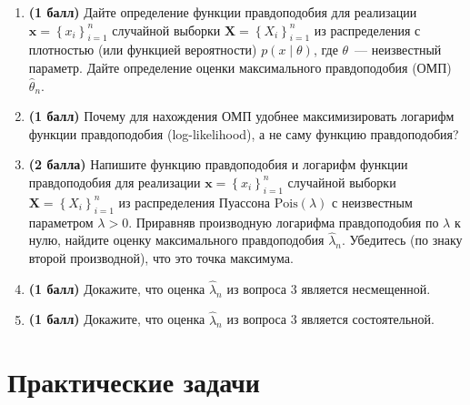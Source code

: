 \documentclass[a4paper,12pt]{article}
\newcommand{\pts}[1]{\textbf{(#1)}}
\begin{document}
\begin{enumerate}
  \item \pts{1 балл} Дайте определение функции правдоподобия для реализации $\mathbf{x}=\left\{x_i\right\}_{i=1}^n$ случайной выборки $\mathbf{X}=\left\{X_i\right\}_{i=1}^n$ из распределения с плотностью (или функцией вероятности) $p(x\mid\theta)$, где $\theta$~--- неизвестный параметр. Дайте определение оценки максимального правдоподобия (ОМП) $\hat\theta_n$.

  \item \pts{1 балл} Почему для нахождения ОМП удобнее максимизировать логарифм функции правдоподобия (log-likelihood), а не саму функцию правдоподобия?

  \item \pts{2 балла} Напишите функцию правдоподобия и логарифм функции правдоподобия для реализации $\mathbf{x}=\left\{x_i\right\}_{i=1}^n$ случайной выборки $\mathbf{X}=\left\{X_i\right\}_{i=1}^n$ из распределения Пуассона $\mathrm{Pois}(\lambda)$ с неизвестным параметром $\lambda>0$. Приравняв производную логарифма правдоподобия по $\lambda$ к нулю, найдите оценку максимального правдоподобия $\hat\lambda_n$. Убедитесь (по знаку второй производной), что это точка максимума.

  \item \pts{1 балл} Докажите, что оценка $\hat\lambda_n$ из вопроса 3 является несмещенной.

  \item \pts{1 балл} Докажите, что оценка $\hat\lambda_n$ из вопроса 3 является состоятельной.

\end{enumerate}

\section*{Практические задачи}
\end{document}
